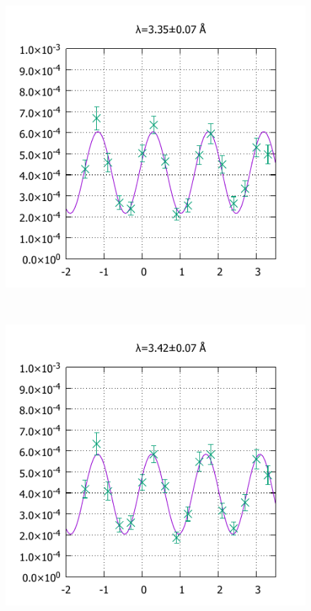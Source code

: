 \begin{figure}[H]
\begin{minipage}{0.33\hsize}
\end{minipage}
\begin{minipage}{0.33\hsize}
\includegraphics[width=\imgwidth]{phase_shifter/wl/wlf3.pdf}
\end{minipage}\\
\begin{minipage}{0.33\hsize}
\includegraphics[width=\imgwidth]{phase_shifter/wl/wlf12.pdf}

\end{minipage}
\end{figure}
